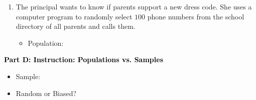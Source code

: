 \documentclass[12pt, letterpaper, fleqn]{article}
\newcommand{\blanklong}{\underline{\hspace{6.5cm}}}
\begin{document}
\begin{enumerate}[itemsep=2.2cm, leftmargin=0.6cm, resume]
\item The principal wants to know if parents support a new dress code. She uses a computer program to randomly select $100$ phone numbers from the school directory of all parents and calls them.
\begin{itemize}
\item Population: \blanklong
\end{itemize}
\end{enumerate}

\newpage

\begin{tcolorbox}[colback=customteal!20]
\large\textcolor{black}{\textbf{Part D: Instruction: Populations vs. Samples}}
\end{tcolorbox}

\vspace{3mm}

\begin{enumerate}[itemsep=2.2cm, leftmargin=0.6cm, resume]
\begin{itemize}
\item Sample: \blanklong
\item Random or Biased? \blanklong
\end{itemize}
\end{enumerate}
\end{document}

